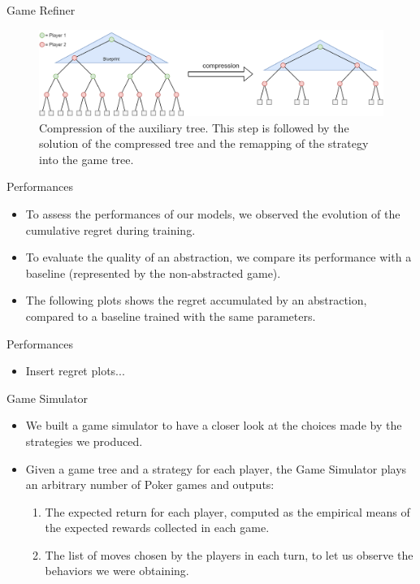 \documentclass[11pt]{beamer}
\begin{document}
\begin{frame}{Game Refiner}
\begin{figure}[hbtp]
		\centering
		\includegraphics[scale=0.2]{images/img_06.png}
		\caption{Compression of the auxiliary tree. This step is followed by the solution of the compressed tree and the remapping of the strategy into the game tree.}
\end{figure}
\end{frame}

\begin{frame}{Performances}
\begin{itemize}
\item To assess the performances of our models, we observed the evolution of the cumulative regret during training.
\item To evaluate the quality of an abstraction, we compare its performance with a baseline (represented by the non-abstracted game).
\item The following plots shows the regret accumulated by an abstraction, compared to a baseline trained with the same parameters.
\end{itemize}
\end{frame}

\begin{frame}{Performances}
\begin{itemize}
\item Insert regret plots...
\end{itemize}
\end{frame}

\begin{frame}{Game Simulator}
\begin{itemize}
\item We built a game simulator to have a closer look at the choices made by the strategies we produced.
\item Given a game tree and a strategy for each player, the Game Simulator plays an arbitrary number of Poker games and outputs:
\begin{enumerate}
\item The expected return for each player, computed as the empirical means of the expected rewards collected in each game.
\item The list of moves chosen by the players in each turn, to let us observe the behaviors we were obtaining.
\end{enumerate}
\end{itemize}
\end{frame}
\end{document}
